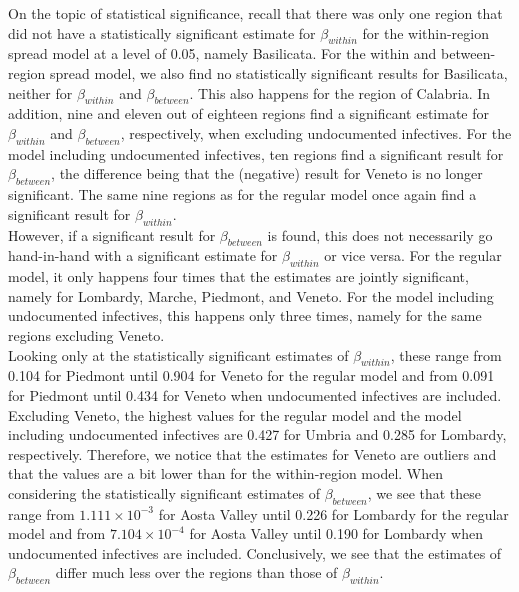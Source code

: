 \documentclass[12pt]{article}
\begin{document}
	On the topic of statistical significance, recall that there was only one region that did not have a statistically significant estimate for $\beta_{within}$ for the within-region spread model at a level of 0.05, namely Basilicata. For the within and between-region spread model, we also find no statistically significant results for Basilicata, neither for $\beta_{within}$ and $\beta_{between}$. This also happens for the region of Calabria. In addition, nine and eleven out of eighteen regions find a significant estimate for $\beta_{within}$ and $\beta_{between}$, respectively, when excluding undocumented infectives. For the model including undocumented infectives, ten regions find a significant result for $\beta_{between}$, the difference being that the (negative) result for Veneto is no longer significant. The same nine regions as for the regular model once again find a significant result for $\beta_{within}$. \\
	
	However, if a significant result for $\beta_{between}$ is found, this does not necessarily go hand-in-hand with a significant estimate for $\beta_{within}$ or vice versa. For the regular model, it only happens four times that the estimates are jointly significant, namely for Lombardy, Marche, Piedmont, and Veneto. For the model including undocumented infectives, this happens only three times, namely for the same regions excluding Veneto. \\
	
	Looking only at the statistically significant estimates of $\beta_{within}$, these range from 0.104 for Piedmont until 0.904 for Veneto for the regular model and from 0.091 for Piedmont until 0.434 for Veneto when undocumented infectives are included. Excluding Veneto, the highest values for the regular model and the model including undocumented infectives are 0.427 for Umbria and 0.285 for Lombardy, respectively. Therefore, we notice that the estimates for Veneto are outliers and that the values are a bit lower than for the within-region model. When considering the statistically significant estimates of $\beta_{between}$, we see that these range from $1.111 \times 10^{-3}$ for Aosta Valley until 0.226 for Lombardy for the regular model and from $7.104 \times 10^{-4}$ for Aosta Valley until 0.190 for Lombardy when undocumented infectives are included. Conclusively, we see that the estimates of $\beta_{between}$ differ much less over the regions than those of $\beta_{within}$. \\
	
\end{document}
